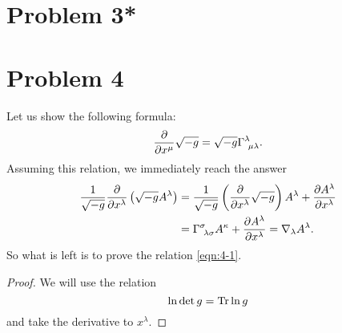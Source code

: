 \documentclass[a4paper,pdftex,10pt]{article}
\begin{document}
\clearpage
\section{Problem 3*}















\clearpage
\section{Problem 4}

Let us show the following formula:
\begin{equation}
  \pdv{}{x^{\mu}}\sqrt{-g}
  =
  \sqrt{-g}\Gamma^{\lambda}_{\ \mu\lambda}
  .
  \label{eqn:4-1}
\end{equation}
Assuming this relation, we immediately reach the answer
\begin{align}
  \frac{1}{\sqrt{-g}}\pdv{}{x^{\lambda}}\left(\sqrt{-g}A^{\lambda}\right)
  &=
  \frac{1}{\sqrt{-g}}\left( \pdv{}{x^{\lambda}}\sqrt{-g} \right)A^{\lambda}
  +
  \pdv{A^{\lambda}}{x^{\lambda}}
  \nonumber
  \\
  &=
  \Gamma^{\sigma}_{\ \lambda\sigma}A^{\kappa}
  +
  \pdv{A^{\lambda}}{x^{\lambda}}
  =
  \nabla_{\lambda}A^{\lambda}
  .
\end{align}
So what is left is to prove the relation \eqref{eqn:4-1}.
\begin{proof}
  We will use the relation 
  \begin{equation}
    \ln \det g
    =
    \Tr \ln g
    \label{eqn:4-2}
  \end{equation}
  and take the derivative to $x^{\lambda}$.
\end{proof}












% 
% 

\end{document}
